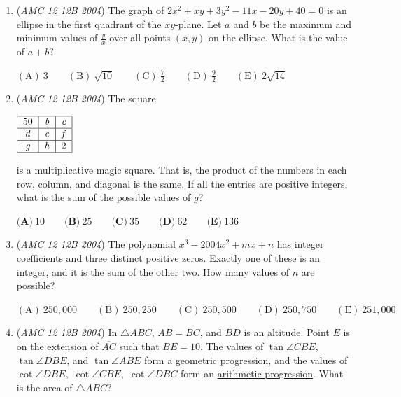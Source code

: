 \begin{enumerate}
 $\textbf{(A)}\ \frac14 \qquad \textbf{(B)}\ \frac {5}{16} \qquad \textbf{(C)}\ \frac38 \qquad \textbf{(D)}\ \frac {7}{16} \qquad \textbf{(E)}\ \frac12$


	\item (\textit{AMC 12 12B 2004}) The graph of $2x^2 + xy + 3y^2 - 11x - 20y + 40 = 0$ is an ellipse in the first quadrant of the $xy$-plane. Let $a$ and $b$ be the maximum and minimum values of $\frac yx$ over all points $(x,y)$ on the ellipse. What is the value of $a+b$?


 $\mathrm{(A)}\ 3 \qquad\mathrm{(B)}\ \sqrt{10} \qquad\mathrm{(C)}\ \frac 72 \qquad\mathrm{(D)}\ \frac 92 \qquad\mathrm{(E)}\ 2\sqrt{14}$


	\item (\textit{AMC 12 12B 2004}) The square


 $\begin{tabular}{|c|c|c|} \hline 50 & \textit{b} & \textit{c} \\ \hline \textit{d} & \textit{e} & \textit{f} \\ \hline \textit{g} & \textit{h} & 2 \\ \hline \end{tabular}$

 is a multiplicative magic square. That is, the product of the numbers in each row, column, and diagonal is the same. If all the entries are positive integers, what is the sum of the possible values of $g$?


 $\textbf{(A)}\ 10 \qquad \textbf{(B)}\ 25 \qquad \textbf{(C)}\ 35 \qquad \textbf{(D)}\ 62 \qquad \textbf{(E)}\ 136$


	\item (\textit{AMC 12 12B 2004}) The \href{https://artofproblemsolving.com/wiki/index.php?title=Polynomial}{polynomial} $x^3 - 2004 x^2 + mx + n$ has \href{https://artofproblemsolving.com/wiki/index.php?title=Integer}{integer} coefficients and three distinct positive zeros. Exactly one of these is an integer, and it is the sum of the other two.  How many values of $n$ are possible?


 $\mathrm{(A)}\ 250,000 \qquad\mathrm{(B)}\ 250,250 \qquad\mathrm{(C)}\ 250,500 \qquad\mathrm{(D)}\ 250,750 \qquad\mathrm{(E)}\ 251,000$


	\item (\textit{AMC 12 12B 2004}) In $\triangle ABC$, $AB = BC$, and $\overline{BD}$ is an \href{https://artofproblemsolving.com/wiki/index.php?title=Altitude}{altitude}. Point $E$ is on the extension of $\overline{AC}$ such that $BE = 10$. The values of $\tan \angle CBE$, $\tan \angle DBE$, and $\tan \angle ABE$ form a \href{https://artofproblemsolving.com/wiki/index.php?title=Geometric\_progression}{geometric progression}, and the values of $\cot \angle DBE,$ $\cot \angle CBE,$ $\cot \angle DBC$ form an \href{https://artofproblemsolving.com/wiki/index.php?title=Arithmetic\_progression}{arithmetic progression}. What is the area of $\triangle ABC$?



\end{enumerate}
